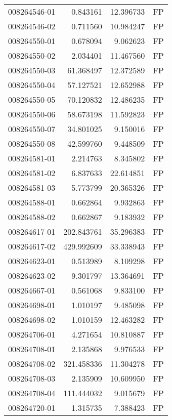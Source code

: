 \begin{tabular}{lrrl}
008264546-01 &    0.843161 &      12.396733 &   FP \\
008264546-02 &    0.711560 &      10.984247 &   FP \\
008264550-01 &    0.678094 &       9.062623 &   FP \\
008264550-02 &    2.034401 &      11.467560 &   FP \\
008264550-03 &   61.368497 &      12.372589 &   FP \\
008264550-04 &   57.127521 &      12.652988 &   FP \\
008264550-05 &   70.120832 &      12.486235 &   FP \\
008264550-06 &   58.673198 &      11.592823 &   FP \\
008264550-07 &   34.801025 &       9.150016 &   FP \\
008264550-08 &   42.599760 &       9.448509 &   FP \\
008264581-01 &    2.214763 &       8.345802 &   FP \\
008264581-02 &    6.837633 &      22.614851 &   FP \\
008264581-03 &    5.773799 &      20.365326 &   FP \\
008264588-01 &    0.662864 &       9.932863 &   FP \\
008264588-02 &    0.662867 &       9.183932 &   FP \\
008264617-01 &  202.843761 &      35.296383 &   FP \\
008264617-02 &  429.992609 &      33.338943 &   FP \\
008264623-01 &    0.513989 &       8.109298 &   FP \\
008264623-02 &    9.301797 &      13.364691 &   FP \\
008264667-01 &    0.561068 &       9.833100 &   FP \\
008264698-01 &    1.010197 &       9.485098 &   FP \\
008264698-02 &    1.010159 &      12.463282 &   FP \\
008264706-01 &    4.271654 &      10.810887 &   FP \\
008264708-01 &    2.135868 &       9.976533 &   FP \\
008264708-02 &  321.458336 &      11.304278 &   FP \\
008264708-03 &    2.135909 &      10.609950 &   FP \\
008264708-04 &  111.444032 &       9.015679 &   FP \\
008264720-01 &    1.315735 &       7.388423 &   FP \\

\end{tabular}
